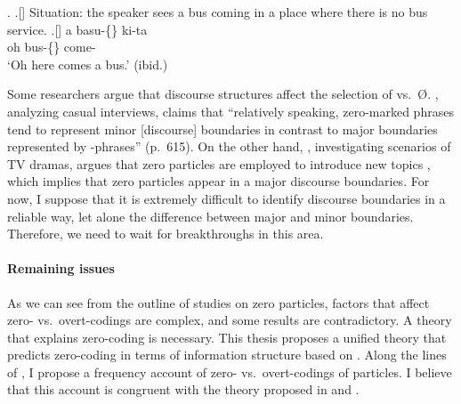 \ex.
 \a.[] Situation: the speaker sees a bus coming in a place
       where there is no bus service.
 \bg.[] a basu-\{\} ki-ta \\
      oh bus-\{\} come- \\
      `Oh here comes a bus.'
      \hfill{(ibid.)}


Some researchers argue that
discourse structures affect the selection of  vs.~{\O}.
, analyzing casual interviews,
claims that
``relatively speaking, zero-marked phrases tend to represent
minor [discourse] boundaries in contrast to major boundaries represented
by -phrases'' (p.~615).
On the other hand,
,
investigating scenarios of TV dramas,
argues that zero particles are employed to introduce new topics
\cite[see also][]{niwa06},
which implies that zero particles appear in a major discourse boundaries.
For now,
I suppose that it is extremely difficult to identify discourse boundaries in a reliable way,
let alone the difference between major and minor boundaries.
Therefore, we need to wait for breakthroughs in this area.

\paragraph{Remaining issues}

As we can see from the outline of studies on zero particles,
factors that affect zero- vs.~overt-codings are complex,
and some results are contradictory.
A theory that explains zero-coding is necessary.
This thesis proposes a unified theory that predicts zero-coding in terms of
information structure
based on .
Along the lines of ,
I propose a frequency account of zero- vs.~overt-codings of particles.
I believe that this account is congruent with
the theory proposed in  and .



